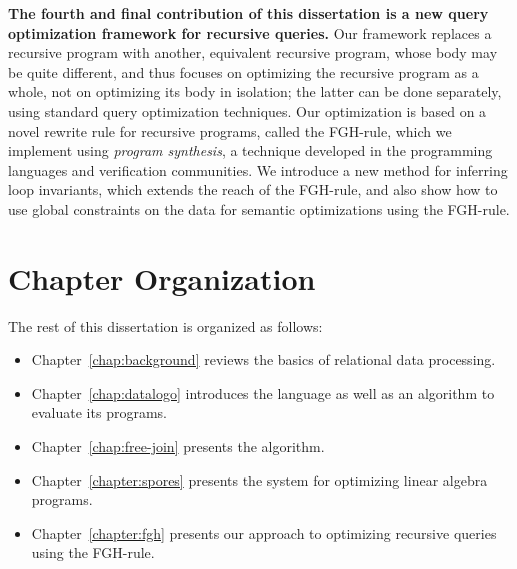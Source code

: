\textbf{The fourth and final contribution of this dissertation is a new query optimization framework for
recursive queries.}
Our framework replaces a recursive program with
another, equivalent recursive program, whose body may be quite
different, and thus focuses on optimizing the recursive program as a
whole, not on optimizing its body in isolation; the latter can be done
separately, using standard query optimization techniques.  Our
optimization is based on a novel rewrite rule for recursive programs,
called the FGH-rule, which we implement using {\em program synthesis},
a technique developed in the programming languages and verification
communities. We introduce a new method for inferring loop invariants,
which extends the reach of the FGH-rule, and also show how to use
global constraints on the data for semantic optimizations using the
FGH-rule.  

\section{Chapter Organization}

The rest of this dissertation is organized as follows:
\begin{itemize}
  \item Chapter~\ref{chap:background} reviews the basics of relational data processing.
  \item Chapter~\ref{chap:datalogo} introduces the \datalogo language as well as an algorithm to evaluate its programs. 
  \item Chapter~\ref{chap:free-join} presents the \FJ algorithm.
  \item Chapter~\ref{chapter:spores} presents the \sys system for optimizing linear algebra programs.
  \item Chapter~\ref{chapter:fgh} presents our approach to optimizing recursive queries using the FGH-rule.
\end{itemize}